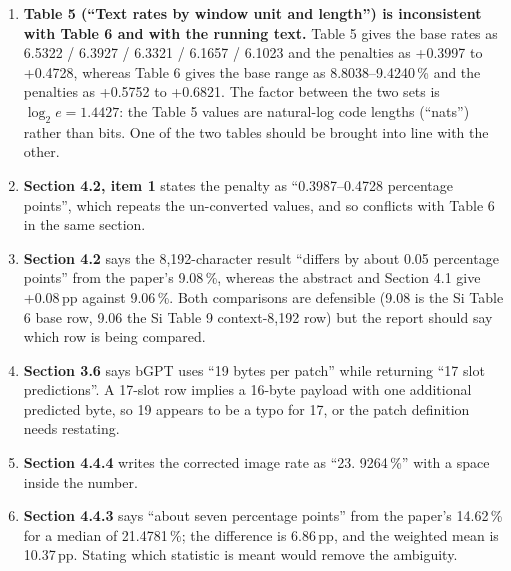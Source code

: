 \documentclass[12pt,a4paper]{article}
\begin{document}
\begin{enumerate}[label=\arabic*.,leftmargin=*]
  \item \textbf{Table 5 (``Text rates by window unit and length'') is inconsistent with
        Table 6 and with the running text.} Table 5 gives the base rates as 6.5322 / 6.3927 /
        6.3321 / 6.1657 / 6.1023 and the penalties as +0.3997 to +0.4728, whereas Table 6 gives
        the base range as 8.8038--9.4240\,\% and the penalties as +0.5752 to +0.6821. The factor
        between the two sets is $\log_2 e = 1.4427$: the Table 5 values are natural-log code
        lengths (``nats'') rather than bits. One of the two tables should be brought into line
        with the other.
  \item \textbf{Section 4.2, item 1} states the penalty as ``0.3987--0.4728 percentage points'',
        which repeats the un-converted values, and so conflicts with Table 6 in the same
        section.
  \item \textbf{Section 4.2} says the 8{,}192-character result ``differs by about 0.05
        percentage points'' from the paper's 9.08\,\%, whereas the abstract and Section 4.1 give
        +0.08\,pp against 9.06\,\%. Both comparisons are defensible (9.08 is the Si Table 6
        base row, 9.06 the Si Table 9 context-8{,}192 row) but the report should say which row
        is being compared.
  \item \textbf{Section 3.6} says bGPT uses ``19 bytes per patch'' while returning ``17 slot
        predictions''. A 17-slot row implies a 16-byte payload with one additional predicted
        byte, so 19 appears to be a typo for 17, or the patch definition needs restating.
  \item \textbf{Section 4.4.4} writes the corrected image rate as ``23. 9264\,\%'' with a space
        inside the number.
  \item \textbf{Section 4.4.3} says ``about seven percentage points'' from the paper's
        14.62\,\% for a median of 21.4781\,\%; the difference is 6.86\,pp, and the weighted
        mean is 10.37\,pp. Stating which statistic is meant would remove the ambiguity.
\end{enumerate}
\end{document}
